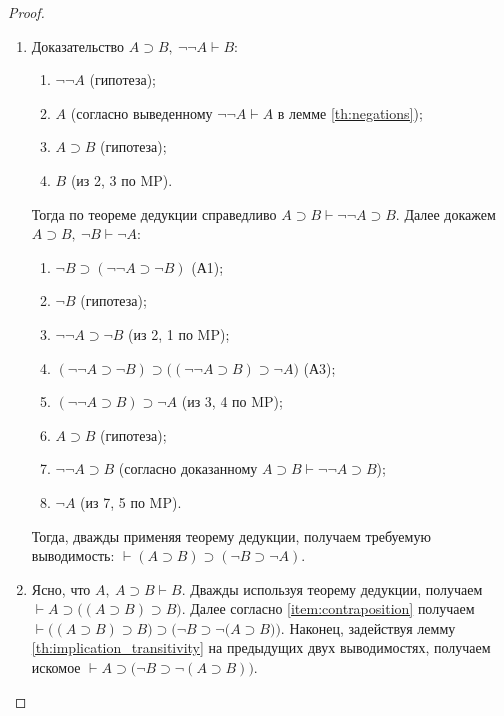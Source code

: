 \begin{proof}
\begin{enumerate}[label=\arabic*)]
        \item Доказательство $A \supset B,\ \neg\neg A \vdash B$:
        \begin{enumerate}[label=\arabic*.]
            \item $\neg\neg A$ (гипотеза);
            \item $A$ (согласно выведенному $\neg\neg A \vdash A$ в лемме \ref{th:negations});
            \item $A \supset B$ (гипотеза);
            \item $B$ (из 2, 3 по MP).
        \end{enumerate}
        Тогда по теореме дедукции справедливо $A \supset B \vdash \neg\neg A \supset B$. Далее докажем $A \supset B,\ \neg B \vdash \neg A$:
        \begin{enumerate}[label=\arabic*.]
            \item $\neg B \supset (\neg\neg A \supset \neg B)$ (А1);
            \item $\neg B$ (гипотеза);
            \item $\neg\neg A \supset \neg B$ (из 2, 1 по MP);
            \item $(\neg\neg A \supset \neg B) \supset \big((\neg\neg A \supset B) \supset \neg A\big)$ (А3);
            \item $(\neg\neg A \supset B) \supset \neg A$ (из 3, 4 по MP);
            \item $A \supset B$ (гипотеза);
            \item $\neg\neg A \supset B$ (согласно доказанному $A \supset B \vdash \neg\neg A \supset B$);
            \item $\neg A$ (из 7, 5 по MP).
        \end{enumerate}
        Тогда, дважды применяя теорему дедукции, получаем требуемую выводимость: $\vdash (A \supset B) \supset (\neg B \supset \neg A)$.

        \item Ясно, что $A,\ A \supset B \vdash B$. Дважды используя теорему дедукции, получаем $\vdash A \supset \big((A \supset B) \supset B\big)$. Далее согласно \ref{item:contraposition} получаем $\vdash \big((A \supset B) \supset B\big) \supset \big(\neg B \supset \neg \big(A \supset B)\big)$. Наконец, задействуя лемму \ref{th:implication_transitivity} на предыдущих двух выводимостях, получаем искомое $\vdash A \supset \big(\neg B \supset \neg(A \supset B)\big)$.


\end{enumerate}
\end{proof}
